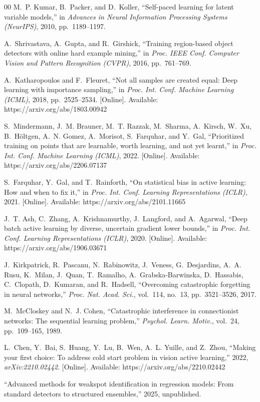 \documentclass[conference]{IEEEtran}
\begin{document}
\begin{thebibliography}{00}
M.~P. Kumar, B.~Packer, and D.~Koller,
``Self-paced learning for latent variable models,''
in \emph{Advances in Neural Information Processing Systems (NeurIPS)}, 2010,
pp.~1189--1197.

A.~Shrivastava, A.~Gupta, and R.~Girshick,
``Training region-based object detectors with online hard example mining,''
in \emph{Proc. IEEE Conf. Computer Vision and Pattern Recognition (CVPR)},
2016, pp.~761--769.

A.~Katharopoulos and F.~Fleuret,
``Not all samples are created equal: Deep learning with importance sampling,''
in \emph{Proc. Int. Conf. Machine Learning (ICML)}, 2018, pp.~2525--2534.
[Online]. Available: https://arxiv.org/abs/1803.00942

S.~Mindermann, J.~M. Brauner, M.~T. Razzak, M.~Sharma, A.~Kirsch, W.~Xu,
B.~H\"oltgen, A.~N. Gomez, A.~Morisot, S.~Farquhar, and Y.~Gal,
``Prioritized training on points that are learnable, worth learning, and not
yet learnt,''
in \emph{Proc. Int. Conf. Machine Learning (ICML)}, 2022.
[Online]. Available: https://arxiv.org/abs/2206.07137

S.~Farquhar, Y.~Gal, and T.~Rainforth,
``On statistical bias in active learning: How and when to fix it,''
in \emph{Proc. Int. Conf. Learning Representations (ICLR)}, 2021.
[Online]. Available: https://arxiv.org/abs/2101.11665

J.~T. Ash, C.~Zhang, A.~Krishnamurthy, J.~Langford, and A.~Agarwal,
``Deep batch active learning by diverse, uncertain gradient lower bounds,''
in \emph{Proc. Int. Conf. Learning Representations (ICLR)}, 2020.
[Online]. Available: https://arxiv.org/abs/1906.03671

J.~Kirkpatrick, R.~Pascanu, N.~Rabinowitz, J.~Veness, G.~Desjardins,
A.~A. Rusu, K.~Milan, J.~Quan, T.~Ramalho, A.~Grabska-Barwinska, D.~Hassabis,
C.~Clopath, D.~Kumaran, and R.~Hadsell,
``Overcoming catastrophic forgetting in neural networks,''
\emph{Proc. Nat. Acad. Sci.}, vol.~114, no.~13, pp.~3521--3526, 2017.

M.~McCloskey and N.~J. Cohen,
``Catastrophic interference in connectionist networks: The sequential
learning problem,''
\emph{Psychol. Learn. Motiv.}, vol.~24, pp.~109--165, 1989.

L.~Chen, Y.~Bai, S.~Huang, Y.~Lu, B.~Wen, A.~L. Yuille, and Z.~Zhou,
``Making your first choice: To address cold start problem in vision active
learning,''
2022, \emph{arXiv:2210.02442}.
[Online]. Available: https://arxiv.org/abs/2210.02442

``Advanced methods for weakspot identification in regression models: From
standard detectors to structured ensembles,'' 2025, unpublished.

\end{thebibliography}
\end{document}
